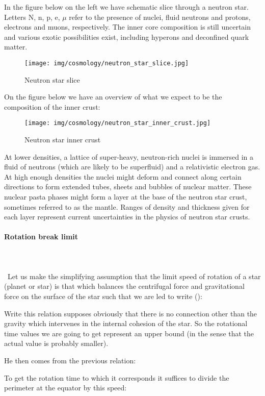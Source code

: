 	
	In the figure below on the left we have schematic slice through a neutron star. Letters N, n, p, e, $\mu$ refer to the presence of nuclei, fluid neutrons and protons, electrons and muons, respectively. The inner core composition is still uncertain and various exotic possibilities exist, including hyperons and deconfined quark matter. 
	\begin{figure}[H]
		\centering
		\texttt{[image: img/cosmology/neutron\_star\_slice.jpg]}	
		\caption{Neutron star slice}
	\end{figure}
	On the figure below we have an overview of what we expect to be the composition of the inner crust:
	\begin{figure}[H]
		\centering
		\texttt{[image: img/cosmology/neutron\_star\_inner\_crust.jpg]}	
		\caption{Neutron star inner crust}
	\end{figure}
	At lower densities, a lattice of super-heavy, neutron-rich nuclei is immersed in a fluid of neutrons (which are likely to be superfluid) and a relativistic electron gas. At high enough densities the nuclei might deform and connect along certain directions to form extended tubes, sheets and bubbles of nuclear matter. These nuclear pasta phases might form a layer at the base of the neutron star crust, sometimes referred to as the mantle. Ranges of density and thickness given for each layer represent current uncertainties in the physics of neutron star crusts.
	
	\paragraph{Rotation break limit}\mbox{}\\\\\
	Let us make the simplifying assumption that the limit speed of rotation of a star (planet or star) is that which balances the centrifugal force and gravitational force on the surface of the star such that we are led to write ():
	
	Write this relation supposes obviously that there is no connection other than the gravity which intervenes in the internal cohesion of the star. So the rotational time values we are going to get represent an upper bound (in the sense that the actual value is probably smaller).
	
	He then comes from the previous relation:
	
	To get the rotation time to which it corresponds it suffices to divide the perimeter at the equator by this speed:
	
